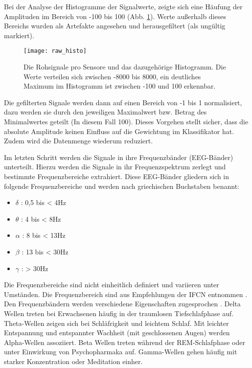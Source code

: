 Bei der Analyse der Histogramme der Signalwerte, zeigte sich eine Häufung der Amplituden im Bereich von -100 bis 100 (Abb. \ref{fig:raw_histo}). Werte außerhalb dieses Bereichs wurden als Artefakte angesehen und herausgefiltert (als ungültig markiert).

\begin{figure}[h] 
  \begin{center}
    \texttt{[image: raw\_histo]}
    \caption[Rohsignal und Histogramm]{Die Rohsignale pro Sensore und das dazugehörige Histogramm. Die Werte verteilen sich zwischen -8000 bis 8000, ein deutliches Maximum im Histogramm ist zwischen -100 und 100 erkennbar.  \label{fig:raw_histo}}
  \end{center}
\end{figure}

Die gefilterten Signale werden dann auf einen Bereich von -1 bis 1 normalisiert, dazu werden sie durch den jeweiligen Maximalwert bzw. Betrag des Minimalwertes geteilt (In diesem Fall 100). Dieses Vorgehen stellt sicher, dass die absolute Amplitude keinen Einfluss auf die Gewichtung im Klassifikator hat. Zudem wird die Datenmenge wiederum reduziert. 

Im letzten Schritt werden die Signale in ihre Frequenzbänder (EEG-Bänder) unterteilt. Hierzu werden die Signale in ihr Frequenzspektrum zerlegt und bestimmte Frequenzbereiche extrahiert. Diese EEG-Bänder gliedern sich in folgende Frequenzbereiche und werden nach griechischen Buchstaben benannt:
\begin{itemize}
 \item $\delta$ : 0,5 bis < 4Hz
 \item $\theta$ :   4 bis < 8Hz
 \item $\alpha$ :   8 bis < 13Hz
 \item $\beta$  :  13 bis < 30Hz
 \item $\gamma$ :  > 30Hz
\end{itemize}
Die Frequenzbereiche sind nicht einheitlich definiert und variieren unter Umständen. Die Frequenzbereich sind aus Empfehlungen der IFCN entnommen \cite{ifcn}. Den Frequenzbändern werden verschiedene Eigenschaften zugesprochen \cite{lei2011,Lv2010,Gundel1992}. Delta Wellen treten bei Erwachsenen häufig in der traumlosen Tiefschlafphase auf. Theta-Wellen zeigen sich bei Schläfrigkeit und leichtem Schlaf. Mit leichter Entspannung und entspannter Wachheit (mit geschlossenen Augen) werden Alpha-Wellen assoziiert. Beta Wellen treten während der REM-Schlafphase oder unter Einwirkung von Psychopharmaka auf. Gamma-Wellen gehen häufig mit starker Konzentration oder Meditation einher.

